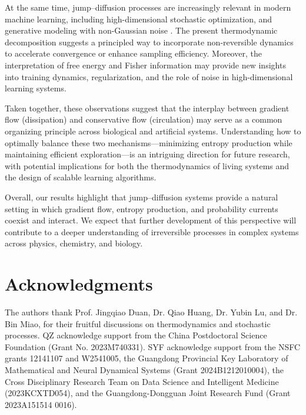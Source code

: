 \documentclass[10pt]{article}
\theoremstyle{definition}
\numberwithin{equation}{section}
\begin{document}
At the same time, jump--diffusion processes are increasingly relevant in modern machine learning, including high-dimensional stochastic optimization, and generative modeling with non-Gaussian noise \cite{BV24,HLMZ25,HHY2025}. 
The present thermodynamic decomposition suggests a principled way to incorporate non-reversible dynamics to accelerate convergence or enhance sampling efficiency. 
Moreover, the interpretation of free energy and Fisher information may provide new insights into training dynamics, regularization, and the role of noise in high-dimensional learning systems.

Taken together, these observations suggest that the interplay between gradient flow (dissipation) and conservative flow (circulation) may serve as a common organizing principle across biological and artificial systems. 
Understanding how to optimally balance these two mechanisms---minimizing entropy production while maintaining efficient exploration---is an intriguing direction for future research, with potential implications for both the thermodynamics of living systems and the design of scalable learning algorithms.

\medskip
\noindent
Overall, our results highlight that jump--diffusion systems provide a natural setting in which gradient flow, entropy production, and probability currents coexist and interact. 
We expect that further development of this perspective will contribute to a deeper understanding of irreversible processes in complex systems across physics, chemistry, and biology.

\section*{Acknowledgments}
The authors thank Prof. Jingqiao Duan, Dr. Qiao Huang, Dr. Yubin Lu, and Dr. Bin Miao, for their fruitful discussions on thermodynamics and stochastic processes.
QZ acknowledge support from the China Postdoctoral Science Foundation (Grant No. 2023M740331).
SYF acknowledge support from the NSFC grants 12141107 and W2541005, the Guangdong Provincial Key Laboratory of Mathematical and Neural Dynamical Systems (Grant 2024B1212010004), the Cross Disciplinary Research Team on Data Science and Intelligent Medicine (2023KCXTD054), and the Guangdong-Dongguan Joint Research Fund (Grant 2023A151514 0016).
\end{document}
